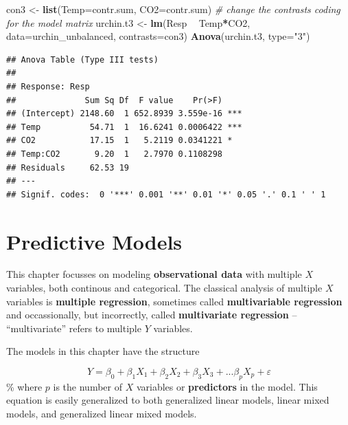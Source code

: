 \documentclass[]{book}
\newenvironment{Shaded}{\begin{snugshade}}{\end{snugshade}}
\newcommand{\CommentTok}[1]{\textcolor[rgb]{0.56,0.35,0.01}{\textit{#1}}}
\newcommand{\DataTypeTok}[1]{\textcolor[rgb]{0.13,0.29,0.53}{#1}}
\newcommand{\KeywordTok}[1]{\textcolor[rgb]{0.13,0.29,0.53}{\textbf{#1}}}
\newcommand{\NormalTok}[1]{#1}
\newcommand{\OperatorTok}[1]{\textcolor[rgb]{0.81,0.36,0.00}{\textbf{#1}}}
\newcommand{\StringTok}[1]{\textcolor[rgb]{0.31,0.60,0.02}{#1}}
\begin{document}
\begin{Shaded}
\begin{Highlighting}[]
\NormalTok{con3 <-}\StringTok{ }\KeywordTok{list}\NormalTok{(}\DataTypeTok{Temp=}\NormalTok{contr.sum, }\DataTypeTok{CO2=}\NormalTok{contr.sum) }\CommentTok{# change the contrasts coding for the model matrix}
\NormalTok{urchin.t3 <-}\StringTok{ }\KeywordTok{lm}\NormalTok{(Resp }\OperatorTok{~}\StringTok{ }\NormalTok{Temp}\OperatorTok{*}\NormalTok{CO2, }\DataTypeTok{data=}\NormalTok{urchin_unbalanced, }\DataTypeTok{contrasts=}\NormalTok{con3)}
\KeywordTok{Anova}\NormalTok{(urchin.t3, }\DataTypeTok{type=}\StringTok{"3"}\NormalTok{)}
\end{Highlighting}
\end{Shaded}

\begin{verbatim}
## Anova Table (Type III tests)
## 
## Response: Resp
##              Sum Sq Df  F value    Pr(>F)    
## (Intercept) 2148.60  1 652.8939 3.559e-16 ***
## Temp          54.71  1  16.6241 0.0006422 ***
## CO2           17.15  1   5.2119 0.0341221 *  
## Temp:CO2       9.20  1   2.7970 0.1108298    
## Residuals     62.53 19                       
## ---
## Signif. codes:  0 '***' 0.001 '**' 0.01 '*' 0.05 '.' 0.1 ' ' 1
\end{verbatim}

\hypertarget{predictive-models}{%
\chapter{Predictive Models}\label{predictive-models}}

This chapter focusses on modeling \textbf{observational data} with multiple \(X\) variables, both continous and categorical. The classical analysis of multiple \(X\) variables is \textbf{multiple regression}, sometimes called \textbf{multivariable regression} and occassionally, but incorrectly, called \textbf{multivariate regression} -- ``multivariate'' refers to multiple \(Y\) variables.

The models in this chapter have the structure

\begin{equation}
Y = \beta_0 + \beta_1 X_1 + \beta_2 X_2 + \beta_3 X_3 + ... \beta_p X_p + \varepsilon 
\end{equation}
\%
where \(p\) is the number of \(X\) variables or \textbf{predictors} in the model. This equation is easily generalized to both generalized linear models, linear mixed models, and generalized linear mixed models.
\end{document}
